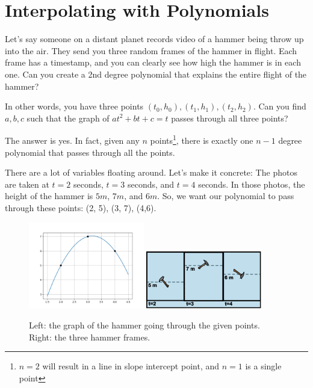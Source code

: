 \chapter{Interpolating with Polynomials}

Let's say someone on a distant planet records video of a hammer being
throw up into the air.  They send you three random frames of the
hammer in flight. Each frame has a timestamp, and you can clearly see
how high the hammer is in each one. Can you create a 2nd degree
polynomial that explains the entire flight of the hammer?

In other words, you have three points $(t_0, h_0), (t_1, h_1), (t_2, h_2)$.
Can you find $a,b,c$ such that the graph of $at^2 + bt + c = t$ passes
through all three points?

The answer is yes.  In fact, given any $n$ points\footnote{$n=2$ will result in a line in slope intercept point, and $n=1$ is a single point}, there is exactly
one $n-1$ degree polynomial that passes through all the points.

There are a lot of variables floating around. Let's make it concrete:
The photos are taken at $t = 2$ seconds, $t = 3$ seconds, and $t = 4$
seconds. In those photos, the height of the hammer is $5m$, $7m$, and
$6m$. So, we want our polynomial to pass through these points: (2, 5),
(3, 7), (4,6).
\begin{figure}[htbp]
    \centering
    \includegraphics[width=0.45\textwidth]{interpolation.png} 
    \includegraphics[width=0.45\textwidth]{hammer_1.png}
    \caption{Left: the graph of the hammer going through the given points. Right: the three hammer frames.}
    \label{fig:hammer_interpolation}
\end{figure}


